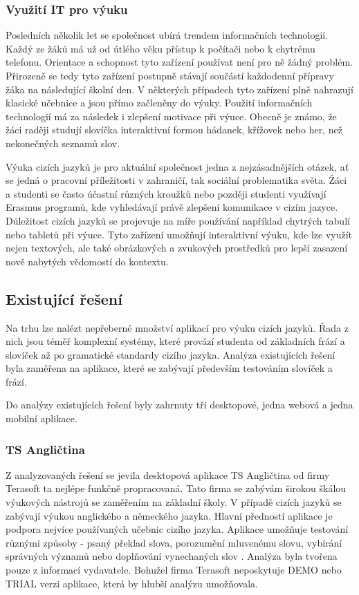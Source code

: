 \documentclass[a4paper,11pt,titlepage,fleqn]{article}
\begin{document}
        \subsubsection{Využití IT pro výuku}
            Posledních několik let se společnost ubírá trendem informačních technologií. Každý ze žáků má už od útlého věku přístup k počítači nebo k chytrému telefonu. Orientace a schopnost tyto zařízení používat není pro ně žádný problém. Přirozeně se tedy tyto zařízení postupně stávají součástí každodenní přípravy žáka na následující školní den. V některých případech tyto zařízení plně nahrazují klasické učebnice a jsou přímo začleněny do výuky. Použití informačních technologií má za následek i zlepšení motivace při výuce. Obecně je známo, že žáci raději studují slovíčka interaktivní formou hádanek, křížovek nebo her, než nekonečných seznamů slov.

            Výuka cizích jazyků je pro aktuální společnost jedna z nejzásadnějších otázek, ať se jedná o pracovní příležitosti v zahraničí, tak sociální problematika světa. Žáci a studenti se často účastní různých kroužků nebo později studenti využívají Erasmus programů, kde vyhledávají právě zlepšení komunikace v cizím jazyce. 
            Důležitost cizích jazyků se projevuje na míře používání například chytrých tabulí nebo tabletů při výuce. Tyto zařízení umožňují interaktivní výuku, kde lze využít nejen textových, ale také obrázkových a zvukových prostředků pro lepší zasazení nově nabytých vědomostí do kontextu. 


    \subsection{Existující řešení}
        Na trhu lze nalézt nepřeberné množství aplikací pro výuku cizích jazyků. Řada z nich jsou téměř komplexní systémy, které provází studenta od základních frází a slovíček až po gramatické standardy cizího jazyka. Analýza existujících řešení byla zaměřena na aplikace, které se zabývají především testováním slovíček a frází.

        Do analýzy existujících řešení byly zahrnuty tři desktopové, jedna webová a jedna mobilní aplikace.

        \subsubsection{TS Angličtina}
            Z analyzovaných řešení se jevila desktopová aplikace TS Angličtina od firmy Terasoft ta nejlépe funkčně propracovaná. Tato firma se zabývám širokou škálou výukových nástrojů se zaměřením na základní školy. V případě cizích jazyků se zabývají výukou anglického a německého jazyka. Hlavní předností aplikace je podpora nejvíce používaných učebnic cizího jazyka. Aplikace umožňuje testování různými způsoby - psaný překlad slova, porozumění mluvenému slovu, vybírání správných významů nebo doplňování vynechaných slov \cite{bib:terasoft}. Analýza byla tvořena pouze z informací vydavatele. Bohužel firma Terasoft neposkytuje DEMO nebo TRIAL verzi aplikace, která by hlubší analýzu umožňovala.
\end{document}
